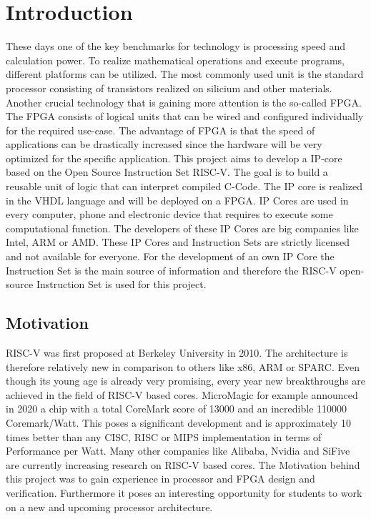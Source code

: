 
\chapter{Introduction}
These days one of the key benchmarks for technology is processing speed and
calculation power. To realize mathematical operations and execute programs,
different platforms can be utilized. The most commonly used unit is the standard
processor consisting of transistors realized on silicium and other materials.
Another crucial technology that is gaining more attention is the so-called
\acf{FPGA}. The FPGA consists of logical units that can
be wired and configured individually for the required use-case. The advantage of
FPGA is that the speed of applications can be drastically increased since the
hardware will be very optimized for the specific application.
This project aims to develop a \acf{IP}-core based on the Open
Source Instruction Set \acs{RISC}-V. The goal is to build a reusable unit of logic that can
interpret compiled C-Code. The IP core is realized in the \ac{VHDL} language and will be deployed on a FPGA. IP Cores are used in every computer, phone and electronic device that requires to execute some computational function. The developers of these IP Cores are big
companies like Intel, ARM or AMD. These IP Cores and Instruction Sets are strictly
licensed and not available for everyone. For the development of an own IP Core the
Instruction Set is the main source of information and therefore the RISC-V
open-source Instruction Set is used for this project.
\section{Motivation}
RISC-V was first proposed at Berkeley University in 2010. The architecture is
therefore relatively new in comparison to others like x86, ARM or SPARC. Even
though its young age is already very promising, every year new breakthroughs are
achieved in the field of RISC-V based cores.
MicroMagic for example announced in 2020 a chip with a total CoreMark score of
13000 and an incredible 110000 Coremark/Watt. This poses a significant
development and is approximately 10 times better than any CISC, RISC or MIPS
implementation in terms of Performance per Watt.
Many other companies like Alibaba, Nvidia and SiFive are currently increasing
research on RISC-V based cores.
The Motivation behind this project was to gain experience in processor and \ac{FPGA}
design and verification. Furthermore it poses an interesting opportunity for students
to work on a new and upcoming processor architecture.


